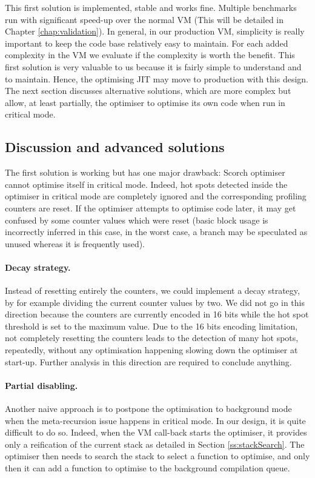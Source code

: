 \documentclass[a4paper,12pt,twoside]{../includes/ThesisStyle}
\begin{document}
This first solution is implemented, stable and works fine. Multiple benchmarks run with significant speed-up over the normal VM (This will be detailed in Chapter \ref{chap:validation}). In general, in our production VM, simplicity is really important to keep the code base relatively easy to maintain. For each added complexity in the VM we evaluate if the complexity is worth the benefit. This first solution is very valuable to us because it is fairly simple to understand and to maintain. Hence, the optimising JIT may move to production with this design. The next section discusses alternative solutions, which are more complex but allow, at least partially, the optimiser to optimise its own code when run in critical mode.

\subsection{Discussion and advanced solutions}

The first solution is working but has one major drawback: Scorch optimiser cannot optimise itself in critical mode. Indeed, hot spots detected inside the optimiser in critical mode are completely ignored and the corresponding profiling counters are reset. If the optimiser attempts to optimise code later, it may get confused by some counter values which were reset (basic block usage is incorrectly inferred in this case, in the worst case, a branch may be speculated as unused whereas it is frequently used). 

\paragraph{Decay strategy.} Instead of resetting entirely the counters, we could implement a decay strategy, by for example dividing the current counter values by two. We did not go in this direction because the counters are currently encoded in 16 bits while the hot spot threshold is set to the maximum value. Due to the 16 bits encoding limitation, not completely resetting the counters leads to the detection of many hot spots, repeatedly, without any optimisation happening slowing down the optimiser at start-up. Further analysis in this direction are required to conclude anything.

\paragraph{Partial disabling.} \label{par:PartialDisabing} Another naive approach is to postpone the optimisation to background mode when the meta-recursion issue happens in critical mode. In our design, it is quite difficult to do so. Indeed, when the VM call-back starts the optimiser, it provides only a reification of the current stack as detailed in Section \ref{ss:stackSearch}. The optimiser then needs to search the stack to select a function to optimise, and only then it can add a function to optimise to the background compilation queue. 
\end{document}
